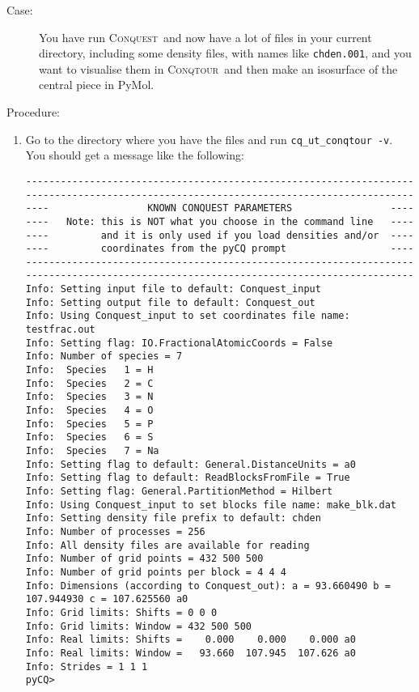 \documentclass[a4paper,notitlepage,11pt]{article}
\def\CQ{\textsc{Conquest}}
\def\Conqtour{\textsc{Conqtour}}
\begin{document}
\begin{description}
\item[Case: ] You have run \CQ\ and now have a lot of files in your current
directory, including some density files, with names like \texttt{chden.001}, and
you want to visualise them in \Conqtour\ and then make an isosurface of the
central piece in PyMol.
\item[Procedure: ] 
\end{description}
\begin{enumerate}
  \item Go to the directory where you have the files and run
  \texttt{cq\_ut\_conqtour -v}. You should get a message like the following:
{\scriptsize
  \begin{verbatim}
-------------------------------------------------------------------
-------------------------------------------------------------------
----                 KNOWN CONQUEST PARAMETERS                 ----
----   Note: this is NOT what you choose in the command line   ----
----         and it is only used if you load densities and/or  ----
----         coordinates from the pyCQ prompt                  ----
-------------------------------------------------------------------
-------------------------------------------------------------------
Info: Setting input file to default: Conquest_input
Info: Setting output file to default: Conquest_out
Info: Using Conquest_input to set coordinates file name: testfrac.out
Info: Setting flag: IO.FractionalAtomicCoords = False
Info: Number of species = 7
Info:  Species   1 = H
Info:  Species   2 = C
Info:  Species   3 = N
Info:  Species   4 = O
Info:  Species   5 = P
Info:  Species   6 = S
Info:  Species   7 = Na
Info: Setting flag to default: General.DistanceUnits = a0
Info: Setting flag to default: ReadBlocksFromFile = True
Info: Setting flag: General.PartitionMethod = Hilbert
Info: Using Conquest_input to set blocks file name: make_blk.dat
Info: Setting density file prefix to default: chden
Info: Number of processes = 256
Info: All density files are available for reading
Info: Number of grid points = 432 500 500
Info: Number of grid points per block = 4 4 4
Info: Dimensions (according to Conquest_out): a = 93.660490 b = 107.944930 c = 107.625560 a0
Info: Grid limits: Shifts = 0 0 0
Info: Grid limits: Window = 432 500 500
Info: Real limits: Shifts =    0.000    0.000    0.000 a0
Info: Real limits: Window =   93.660  107.945  107.626 a0
Info: Strides = 1 1 1
pyCQ>                                                               
  \end{verbatim}
}
\end{enumerate}
\end{document}
